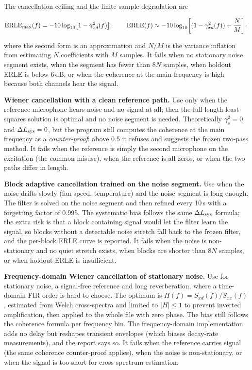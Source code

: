 \documentclass[UTF8,a4paper,12pt]{ctexart}
\begin{document}
The cancellation ceiling and the finite-sample degradation are

\[
{\rm ERLE}_{\max}(f)=-10\log_{10}\!\left[1-\gamma_{xd}^{2}(f)\right],
\qquad
{\rm ERLE}(f)\approx-10\log_{10}\!\left[(1-\gamma_{xd}^{2}(f))+\frac{N}{M}\right],
\]

where the second form is an approximation and $N/M$ is the variance inflation from estimating $N$ coefficients with $M$ samples. It fails when no stationary noise segment exists, when the segment has fewer than $8N$ samples, when holdout ERLE is below 6\,dB, or when the coherence at the main frequency is high because both channels hear the signal.

\textbf{Wiener cancellation with a clean reference path.} Use only when the reference microphone hears noise and no signal at all; then the full-length least-squares solution is optimal and no noise segment is needed. Theoretically $\gamma_s^2=0$ and $\Delta L_{\rm sys}=0$, but the program still computes the coherence at the main frequency as a \emph{counter-proof}: above 0.5 it refuses and suggests the frozen two-pass method. It fails when the reference is simply the second microphone on the excitation (the common misuse), when the reference is all zeros, or when the two paths differ in length.

\textbf{Block adaptive cancellation trained on the noise segment.} Use when the noise drifts slowly (fan speed, temperature) and the noise segment is long enough. The filter is solved on the noise segment and then refined every 10\,s with a forgetting factor of 0.995. The systematic bias follows the same $\Delta L_{\rm sys}$ formula; the extra risk is that a block containing signal would let the filter learn the signal, so blocks without a detectable noise stretch fall back to the frozen filter, and the per-block ERLE curve is reported. It fails when the noise is non-stationary and no quiet stretch exists, when blocks are shorter than $8N$ samples, or when holdout ERLE is insufficient.

\textbf{Frequency-domain Wiener cancellation of stationary noise.} Use for stationary noise, a signal-free reference and long reverberation, where a time-domain FIR order is hard to choose. The optimum is $H(f)=S_{xd}(f)/S_{xx}(f)$, estimated from Welch cross-spectra and limited to $|H|\le1$ to prevent inverted amplification, then applied to the whole file with zero phase. The bias still follows the coherence formula per frequency bin. The frequency-domain implementation adds no delay but reshapes transient envelopes (which biases decay-rate measurements), and the report says so. It fails when the reference carries signal (the same coherence counter-proof applies), when the noise is non-stationary, or when the signal is too short for cross-spectrum estimation.
\end{document}
